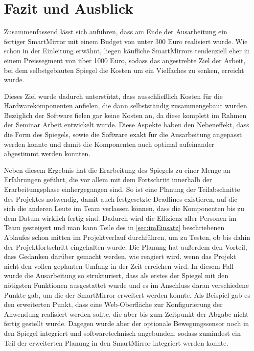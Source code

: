 \section{Fazit und Ausblick}

Zusammenfassend lässt sich anführen, dass am Ende der Ausarbeitung ein fertiger SmartMirror mit einem Budget von unter 300 Euro realisiert wurde. 
Wie schon in der Einleitung erwähnt, liegen käufliche SmartMirrors tendenziell eher in einem Preissegment von über 1000 Euro, sodass das angestrebte Ziel der Arbeit, bei dem selbstgebauten Spiegel die Kosten um ein Vielfaches zu senken, erreicht wurde.

Dieses Ziel wurde dadurch unterstützt, dass ausschließlich Kosten für die Hardwarekomponenten anfielen, die dann selbstständig zusammengebaut wurden. Bezüglich der Software fielen gar keine Kosten an, da diese komplett im Rahmen der Seminar Arbeit entwickelt wurde.
Diese Aspekte haben den Nebeneffekt, dass die Form des Spiegels, sowie die Software exakt für die Ausarbeitung angepasst werden konnte und damit die Komponenten auch optimal aufeinander abgestimmt werden konnten.

Neben diesem Ergebnis hat die Erarbeitung des Spiegels zu einer Menge an Erfahrungen geführt, die vor allem mit dem Fortschritt innerhalb der Erarbeitungsphase einhergegangen sind.
So ist eine Planung der Teilabschnitte des Projektes notwendig, damit auch festgesetzte Deadlines existieren, auf die sich die anderen Leute im Team verlassen können, dass die Komponenten bis zu dem Datum wirklich fertig sind. Dadurch wird die Effizienz aller Personen im Team gesteigert und man kann Teile des in \autoref{sec:imEinsatz} beschriebenen Ablaufes schon mitten im Projektverlauf durchführen, um zu Testen, ob bis dahin der Projektfortschritt eingehalten wurde. 
Die Planung hat außerdem den Vorteil, dass Gedanken darüber gemacht werden, wie reagiert wird, wenn das Projekt nicht den vollen geplanten Umfang in der Zeit erreichen wird. In diesem Fall wurde die Ausarbeitung so strukturiert, dass als erstes der Spiegel mit den nötigsten Funktionen ausgestattet wurde und es im Anschluss daran verschiedene Punkte gab, um die der SmartMirror erweitert werden konnte. Als Beispiel gab es den erweiterten Punkt, dass eine Web-Oberfläche zur Konfigurierung der Anwendung realisiert werden sollte, die aber bis zum Zeitpunkt der Abgabe nicht fertig gestellt wurde. Dagegen wurde aber der optionale Bewegungssensor noch in den Spiegel integriert und softwaretechnisch angebunden, sodass zumindest ein Teil der erweiterten Planung in den SmartMirror integriert werden konnte.

